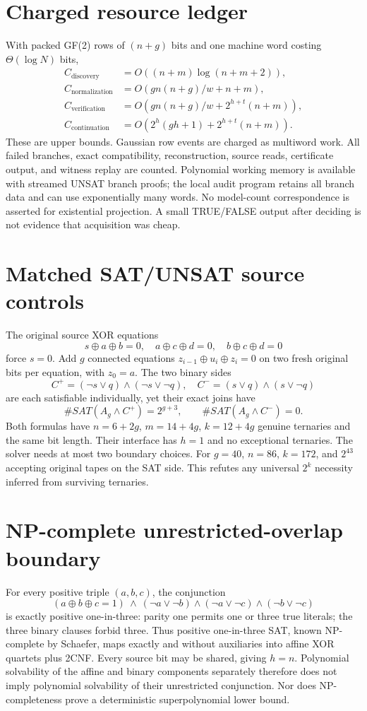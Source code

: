 \documentclass[11pt]{article}
\begin{document}
\section{Charged resource ledger}
With packed GF(2) rows of $(n+g)$ bits and one machine word costing $\Theta(\log N)$ bits,
\[
\begin{aligned}
C_{\mathrm{discovery}}&=O((n+m)\log(n+m+2)),\\
C_{\mathrm{normalization}}&=O(gn(n+g)/w+n+m),\\
C_{\mathrm{verification}}&=O(gn(n+g)/w+2^{h+t}(n+m)),\\
C_{\mathrm{continuation}}&=O(2^h(gh+1)+2^{h+t}(n+m)).
\end{aligned}
\]
These are upper bounds. Gaussian row events are charged as multiword work. All failed branches, exact compatibility, reconstruction, source reads, certificate output, and witness replay are counted. Polynomial working memory is available with streamed UNSAT branch proofs; the local audit program retains all branch data and can use exponentially many words. No model-count correspondence is asserted for existential projection. A small TRUE/FALSE output after deciding is not evidence that acquisition was cheap.
\section{Matched SAT/UNSAT source controls}
The original source XOR equations
\[
s\oplus a\oplus b=0,\quad a\oplus c\oplus d=0,\quad b\oplus c\oplus d=0
\]
force $s=0$. Add $g$ connected equations $z_{i-1}\oplus u_i\oplus z_i=0$ on two fresh original bits per equation, with $z_0=a$. The two binary sides
\[
C^+=(\neg s\vee q)\wedge(\neg s\vee\neg q),\quad
C^-=(s\vee q)\wedge(s\vee\neg q)
\]
are each satisfiable individually, yet their exact joins have
\[
\#SAT(A_g\wedge C^+)=2^{g+3},\qquad \#SAT(A_g\wedge C^-)=0.
\]
Both formulas have $n=6+2g$, $m=14+4g$, $k=12+4g$ genuine ternaries and the same bit length. Their interface has $h=1$ and no exceptional ternaries. The solver needs at most two boundary choices. For $g=40$, $n=86$, $k=172$, and $2^{43}$ accepting original tapes on the SAT side. This refutes any universal $2^k$ necessity inferred from surviving ternaries.
\section{NP-complete unrestricted-overlap boundary}
For every positive triple $(a,b,c)$, the conjunction
\[
(a\oplus b\oplus c=1)\ \wedge\
(\neg a\vee\neg b)\wedge(\neg a\vee\neg c)\wedge(\neg b\vee\neg c)
\]
is exactly positive one-in-three: parity one permits one or three true literals; the three binary clauses forbid three. Thus positive one-in-three SAT, known NP-complete by Schaefer, maps exactly and without auxiliaries into affine XOR quartets plus 2CNF. Every source bit may be shared, giving $h=n$. Polynomial solvability of the affine and binary components separately therefore does not imply polynomial solvability of their unrestricted conjunction. Nor does NP-completeness prove a deterministic superpolynomial lower bound.
\end{document}
